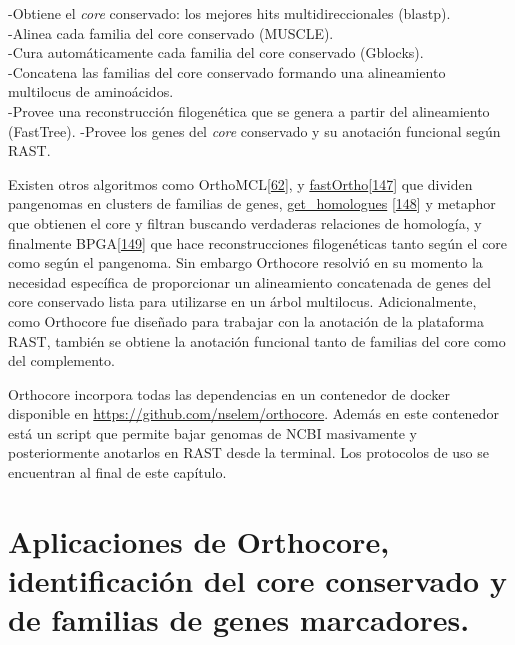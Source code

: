 \documentclass[12pt,twoside]{reedthesis}
\begin{document}
  -Obtiene el \emph{core} conservado: los mejores hits multidireccionales
  (blastp).\\
  -Alinea cada familia del core conservado (MUSCLE).\\
  -Cura automáticamente cada familia del core conservado (Gblocks).\\
  -Concatena las familias del core conservado formando una alineamiento
  multilocus de aminoácidos.\\
  -Provee una reconstrucción filogenética que se genera a partir del
  alineamiento (FastTree). -Provee los genes del \emph{core} conservado y
  su anotación funcional según RAST.
  
  Existen otros algoritmos como
  OrthoMCL{[}\protect\hyperlink{ref-li_orthomcl_2003}{62}{]}, y
  \href{https://github.com/grovesdixon/using_FastOrtho}{fastOrtho}{[}\protect\hyperlink{ref-wattam_patric_2014}{147}{]}
  que dividen pangenomas en clusters de familias de genes,
  \href{http://eead-csic-compbio.github.io/get_homologues/manual/}{get\_homologues}
  {[}\protect\hyperlink{ref-contreras-moreira_get_homologues_2013}{148}{]}
  y metaphor que obtienen el core y filtran buscando verdaderas relaciones
  de homología, y finalmente
  BPGA{[}\protect\hyperlink{ref-chaudhari_bpga-_2016}{149}{]} que hace
  reconstrucciones filogenéticas tanto según el core como según el
  pangenoma. Sin embargo Orthocore resolvió en su momento la necesidad
  específica de proporcionar un alineamiento concatenada de genes del core
  conservado lista para utilizarse en un árbol multilocus. Adicionalmente,
  como Orthocore fue diseñado para trabajar con la anotación de la
  plataforma RAST, también se obtiene la anotación funcional tanto de
  familias del core como del complemento.
  
  Orthocore incorpora todas las dependencias en un contenedor de docker
  disponible en \url{https://github.com/nselem/orthocore}. Además en este
  contenedor está un script que permite bajar genomas de NCBI masivamente
  y posteriormente anotarlos en RAST desde la terminal. Los protocolos de
  uso se encuentran al final de este capítulo.
  
  \section{Aplicaciones de Orthocore, identificación del core conservado y
  de familias de genes
  marcadores.}\label{aplicaciones-de-orthocore-identificacion-del-core-conservado-y-de-familias-de-genes-marcadores.}
  
\end{document}
